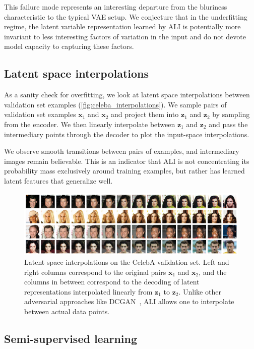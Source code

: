 \documentclass{article}
\begin{document}
This failure mode represents an interesting departure from the bluriness
characteristic to the typical VAE setup. We conjecture that in the underfitting
regime, the latent variable representation learned by ALI is potentially more
invariant to less interesting factors of variation in the input and do not
devote model capacity to capturing these factors.

\subsection{Latent space interpolations}
As a sanity check for overfitting, we look at latent space interpolations
between validation set examples (\autoref{fig:celeba_interpolations}). We sample
pairs of validation set examples $\mathbf{x}_1$ and $\mathbf{x}_2$ and project
them into $\mathbf{z}_1$ and $\mathbf{z}_2$ by sampling from the encoder. We
then linearly interpolate between $\mathbf{z}_1$ and $\mathbf{z}_2$ and pass the
intermediary points through the decoder to plot the input-space interpolations.

We observe smooth transitions between pairs of examples, and intermediary images
remain believable. This is an indicator that ALI is not concentrating its
probability mass exclusively around training examples, but rather has learned
latent features that generalize well.

\begin{figure}[t]
    \centering
    \includegraphics[width=\textwidth]{celeba_interpolations.png}
    \caption{\label{fig:celeba_interpolations} Latent space interpolations on
        the CelebA validation set. Left and right columns correspond to the
        original pairs $\mathbf{x}_1$ and $\mathbf{x}_2$, and the columns in
        between correspond to the decoding of latent representations
        interpolated linearly from $\mathbf{z}_1$ to $\mathbf{z}_2$. Unlike other
        adversarial approaches like DCGAN~\citep{radford2015unsupervised}, ALI
        allows one to interpolate between actual data points.}
\end{figure}

\subsection{Semi-supervised learning}
\end{document}
